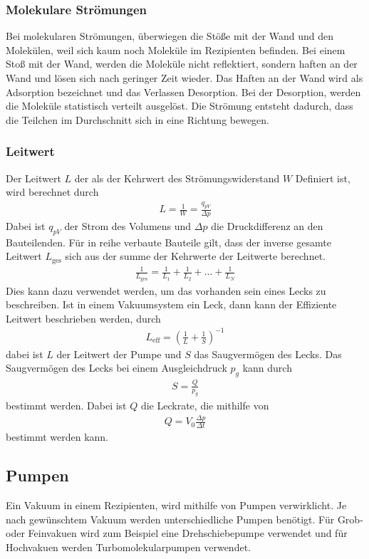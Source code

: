 \subsubsection{Molekulare Strömungen}
Bei molekularen Strömungen, überwiegen die Stöße mit der Wand und den Molekülen, weil sich kaum noch Moleküle im Rezipienten befinden. Bei einem Stoß mit der Wand, werden die Moleküle nicht reflektiert, sondern haften an der Wand und lösen sich nach geringer Zeit wieder. Das Haften an der Wand wird als Adsorption bezeichnet und das Verlassen Desorption.
Bei der Desorption, werden die Moleküle statistisch verteilt ausgelöst. Die Strömung entsteht dadurch, dass die Teilchen im Durchschnitt sich in eine Richtung bewegen.
\subsubsection{Leitwert}
Der Leitwert $L$ der als der Kehrwert des Strömungswiderstand $W$ Definiert ist, wird berechnet durch
\begin{align}
L=\frac{1}{W} = \frac{q_{pV}}{\Delta p}
\end{align}
Dabei ist $q_{pV}$ der Strom des Volumens und $\Delta p$ die Druckdifferenz an den Bauteilenden. Für in reihe verbaute Bauteile  gilt, dass der inverse gesamte Leitwert $L_\text{ges}$ sich aus der summe der Kehrwerte der Leitwerte berechnet.
 \begin{align}
 \frac{1}{L_\text{ges}}=\frac{1}{L_1}+\frac{1}{L_2}+...+\frac{1}{L_N}
 \end{align}
Dies kann dazu verwendet werden, um das vorhanden sein eines Lecks zu beschreiben. Ist in einem Vakuumsystem ein Leck, dann kann der Effiziente Leitwert beschrieben werden, durch
\begin{align}
L_\text{eff}=\left(\frac{1}{L} + \frac{1}{S}  \right)^{-1}
\end{align}
dabei ist $L$ der Leitwert der Pumpe und $S$ das Saugvermögen des Lecks. Das Saugvermögen des Lecks bei einem Ausgleichdruck $p_g$ kann durch 
\begin{align}
S=\frac{Q}{p_g}
\end{align}
bestimmt werden. Dabei ist $Q$ die Leckrate, die mithilfe von 
\begin{align}
Q = V_0 \frac{\Delta p}{\Delta t}
\end{align}
bestimmt werden kann.
 
\subsection{Pumpen}
Ein Vakuum in einem Rezipienten, wird mithilfe von Pumpen verwirklicht. Je nach gewünschtem Vakuum werden unterschiedliche Pumpen benötigt. Für Grob- oder Feinvakuen wird zum Beispiel eine Drehschiebepumpe verwendet und für Hochvakuen werden Turbomolekularpumpen verwendet.
